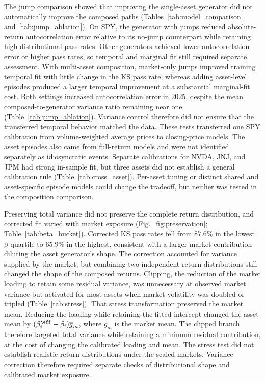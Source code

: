 The jump comparison showed that improving the single-asset generator
did not automatically improve the composed paths
(Tables~\ref{tab:model_comparison} and~\ref{tab:jump_ablation}). On
SPY, the generator with jumps reduced absolute-return autocorrelation
error relative to its no-jump counterpart while retaining high
distributional pass rates. Other generators achieved lower
autocorrelation error or higher pass rates, so temporal and marginal
fit still required separate assessment. With multi-asset composition,
market-only jumps improved training temporal fit with little change
in the KS pass rate, whereas adding asset-level episodes produced a
larger temporal improvement at a substantial marginal-fit cost. Both
settings increased autocorrelation error in $2025$, despite the mean
composed-to-generator variance ratio remaining near one
(Table~\ref{tab:jump_ablation}). Variance control therefore did not
ensure that the transferred temporal behavior matched the data. These
tests transferred one SPY calibration from volume-weighted average
prices to closing-price models. The asset episodes also came from
full-return models and were not identified separately as idiosyncratic
events. Separate calibrations for NVDA, JNJ, and JPM had strong
in-sample fit, but three assets did not establish a general calibration
rule (Table~\ref{tab:cross_asset}). Per-asset tuning or distinct shared
and asset-specific episode models could change the tradeoff, but
neither was tested in the composition comparison.

Preserving total variance did not preserve the complete return
distribution, and corrected fit varied with market exposure
(Fig.~\ref{fig:preservation}; Table~\ref{tab:beta_bucket}). Corrected
KS pass rates fell from $87.6\%$ in the lowest $\beta$ quartile to
$65.9\%$ in the highest, consistent with a larger market contribution
diluting the asset generator's shape. The correction accounted for variance
supplied by the market, but combining two independent
return distributions still changed the shape of the composed returns.
Clipping, the reduction of the market loading to retain some residual
variance, was unnecessary at observed market variance but activated
for most assets when market volatility was doubled or tripled (Table~\ref{tab:stress}). That stress transformation
preserved the market mean. Reducing the loading while retaining the fitted intercept changed
the asset mean by
$(\beta_i^{\eff}-\beta_i)\overline{g}_m$, where $\overline{g}_m$
is the market mean. The clipped branch therefore targeted total variance while retaining
a minimum residual contribution, at the cost of changing the
calibrated loading and mean. The stress test did not establish realistic return distributions
under the scaled markets. Variance correction therefore required separate checks of
distributional shape and calibrated market exposure.

